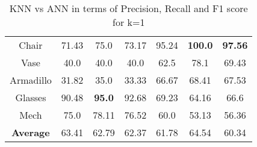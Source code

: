 \begin{table}[H]
\begin{tabular}{c|c|c|c|c|c|c}
        Chair & 71.43 & 75.0 & 73.17 & 95.24 & \textbf{100.0} & \textbf{97.56} \\ 
        Vase & 40.0 & 40.0 & 40.0 & 62.5 & 78.1 & 69.43 \\ 
        Armadillo & 31.82 & 35.0 & 33.33 & 66.67 & 68.41 & 67.53 \\ 
        Glasses & 90.48 & \textbf{95.0} & 92.68 & 69.23 & 64.16 & 66.6 \\ 
        Mech & 75.0 & 78.11 & 76.52 & 60.0 & 53.13 & 56.36 \\ 
        \hline
        \textbf{Average} & 63.41 & 62.79 & 62.37 & 61.78 & 64.54 & 60.34\\
    \end{tabular}
    \caption{KNN vs ANN in terms of Precision, Recall and F1 score for k=1}
    \label{tab:precision-recall-f1-k-1}
\end{table}

